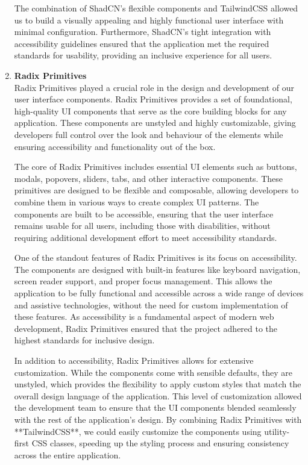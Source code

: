 \begin{enumerate}
    The combination of ShadCN’s flexible components and TailwindCSS allowed us to build a visually appealing and highly functional user interface with minimal configuration. Furthermore, ShadCN's tight integration with accessibility guidelines ensured that the application met the required standards for usability, providing an inclusive experience for all users.

    \item{} \textbf{Radix Primitives} \\
    Radix Primitives played a crucial role in the design and development of our user interface components. Radix Primitives provides a set of foundational, high{-}quality UI components that serve as the core building blocks for any application. These components are unstyled and highly customizable, giving developers full control over the look and behaviour of the elements while ensuring accessibility and functionality out of the box.

    The core of Radix Primitives includes essential UI elements such as buttons, modals, popovers, sliders, tabs, and other interactive components. These primitives are designed to be flexible and composable, allowing developers to combine them in various ways to create complex UI patterns. The components are built to be accessible, ensuring that the user interface remains usable for all users, including those with disabilities, without requiring additional development effort to meet accessibility standards.

    One of the standout features of Radix Primitives is its focus on accessibility. The components are designed with built{-}in features like keyboard navigation, screen reader support, and proper focus management. This allows the application to be fully functional and accessible across a wide range of devices and assistive technologies, without the need for custom implementation of these features. As accessibility is a fundamental aspect of modern web development, Radix Primitives ensured that the project adhered to the highest standards for inclusive design.

    In addition to accessibility, Radix Primitives allows for extensive customization. While the components come with sensible defaults, they are unstyled, which provides the flexibility to apply custom styles that match the overall design language of the application. This level of customization allowed the development team to ensure that the UI components blended seamlessly with the rest of the application’s design. By combining Radix Primitives with **TailwindCSS**, we could easily customize the components using utility{-}first CSS classes, speeding up the styling process and ensuring consistency across the entire application.


\end{enumerate}
